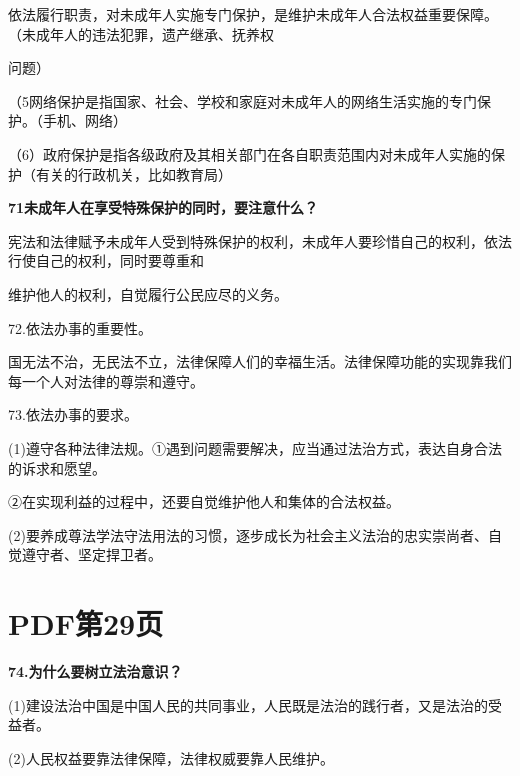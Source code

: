 \documentclass[lang=cn,11pt]{elegantbook}
\newcommand{\daofasym}[1]{{\daofasymbolfont #1}}
\newcommand{\daofasym}[1]{#1}
\begin{document}
依法履行职责，对未成年人实施专门保护，是维护未成年人合法权益重要保障。（未成年人的违法犯罪，遗产继承、抚养权\par

问题）\par

（5网络保护是指国家、社会、学校和家庭对未成年人的网络生活实施的专门保护。（手机、网络）\par

（6）政府保护是指各级政府及其相关部门在各自职责范围内对未成年人实施的保护（有关的行政机关，比如教育局）\par

\textbf{71未成年人在享受特殊保护的同时，要注意什么？}\par

宪法和法律赋予未成年人受到特殊保护的权利，未成年人要珍惜自己的权利，依法行使自己的权利，同时要尊重和\par

维护他人的权利，自觉履行公民应尽的义务。\par

72.依法办事的重要性。\par

国无法不治，无民法不立，法律保障人们的幸福生活。法律保障功能的实现靠我们每一个人对法律的尊崇和遵守。\par

73.依法办事的要求。\par

(1)遵守各种法律法规。\daofasym{①}遇到问题需要解决，应当通过法治方式，表达自身合法的诉求和愿望。\par

\daofasym{②}在实现利益的过程中，还要自觉维护他人和集体的合法权益。\par

(2)要养成尊法学法守法用法的习惯，逐步成长为社会主义法治的忠实崇尚者、自觉遵守者、坚定捍卫者。\par


\section*{PDF第29页}

\textbf{74.为什么要树立法治意识？}\par

(1)建设法治中国是中国人民的共同事业，人民既是法治的践行者，又是法治的受益者。\par

(2)人民权益要靠法律保障，法律权威要靠人民维护。\par
\end{document}
